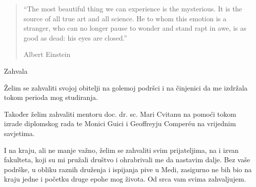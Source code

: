 \documentclass[a4paper,12pt,oneside,openright]{book}
\begin{document}
 
 
\thispagestyle{empty}

\null \hfill

\vfill
\begin{quotation}
\itshape{``The most beautiful thing we can experience is the mysterious. It is the source of all true art and all science. He to whom this emotion is a stranger, who can no longer pause to wonder and stand rapt in awe, is as good as dead: his eyes are closed.''\medskip

\hfill Albert Einstein}
\end{quotation}

\newpage

\thispagestyle{empty}

\vspace*{3cm}

{\hspace{11.2cm} { \fontsize{24.5}{29.4}\selectfont Zahvala}}

\vspace{2.3cm}
Želim se zahvaliti svojoj obitelji na golemoj podršci i na činjenici da me izdržala tokom perioda mog studiranja.\vspace{0.3cm}

Također želim zahvaliti mentoru doc. dr. sc. Mari Cvitanu na pomoći tokom izrade diplomskog rada te Monici Guici i Geoffreyju Comper\'eu na vrijednim savjetima.\vspace{0.3cm}
	
I na kraju, ali ne manje važno, želim se zahvaliti svim prijateljima, na i izvan fakulteta, koji su mi pružali društvo i ohrabrivali me da nastavim dalje. Bez vaše podrške, u obliku raznih druženja i ispijanja pive u Medi, zasigurno ne bih bio na kraju jedne i početku druge epohe mog života. Od srca vam svima zahvaljujem.   

\newpage
\newpage\null\thispagestyle{empty}\newpage


\setcounter{page}{1}
\hypersetup{linkcolor=Black}
\tableofcontents


\hypersetup{linkcolor=DarkGray}
\newpage

\setcounter{page}{1}

\end{document}
